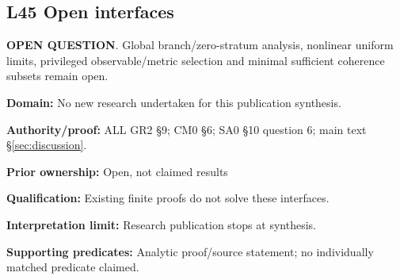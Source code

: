 \par\noindent\begin{minipage}{\linewidth}
\subsection*{L45 Open interfaces}
\textbf{OPEN QUESTION}. Global branch/zero-stratum analysis, nonlinear uniform limits, privileged observable/metric selection and minimal sufficient coherence subsets remain open.\par
\textbf{Domain:} No new research undertaken for this publication synthesis.\par
\textbf{Authority/proof:} ALL GR2 \S{}9; CM0 \S{}6; SA0 \S{}10 question 6; main text \S\ref{sec:discussion}.\par
\textbf{Prior ownership:} Open, not claimed results\par
\textbf{Qualification:} Existing finite proofs do not solve these interfaces.\par
\textbf{Interpretation limit:} Research publication stops at synthesis.\par
\textbf{Supporting predicates:} Analytic proof/source statement; no individually matched predicate claimed.\par
\end{minipage}\par\medskip
\endgroup
